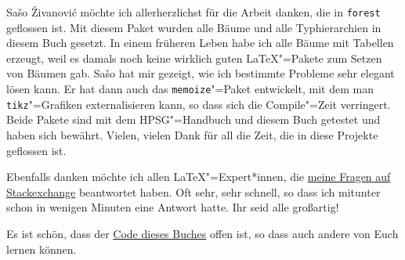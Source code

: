 Sašo Živanović möchte ich allerherzlichst für die Arbeit danken, die in \texttt{forest} geflossen
ist. Mit diesem Paket wurden alle Bäume und alle Typhierarchien in diesem Buch gesetzt. In einem
früheren Leben habe ich alle Bäume mit Tabellen erzeugt, weil es damals noch keine wirklich guten
\LaTeX"=Pakete zum Setzen von Bäumen gab. Sašo hat mir gezeigt, wie ich bestimmte Probleme sehr
elegant lösen kann. Er hat dann auch das \texttt{memoize}"=Paket entwickelt, mit dem man \texttt{tikz}"=Grafiken
externalisieren kann, so dass sich die Compile"=Zeit verringert. Beide Pakete sind mit dem
HPSG"=Handbuch und diesem Buch getestet und haben sich bewährt. Vielen, vielen Dank für all die Zeit,
die in diese Projekte geflossen ist.

Ebenfalls danken möchte ich allen \LaTeX"=Expert*innen, die \href{https://tex.stackexchange.com/users/18561/stefan-m%c3%bcller?tab=questions}{meine Fragen auf Stackexchange}
beantwortet haben. Oft sehr, sehr schnell, so dass ich mitunter schon in wenigen Minuten eine
Antwort hatte. Ihr seid alle großartig!

Es ist schön, dass der \href{https://github.com/stefan11/HPSG-Lehrbuch}{Code dieses Buches} offen ist, so dass auch andere von Euch lernen können.


